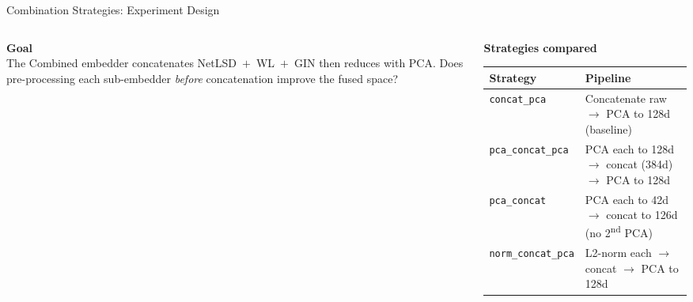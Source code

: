 \documentclass[aspectratio=169,10pt]{beamer}
\begin{document}
\begin{frame}[fragile]{Combination Strategies: Experiment Design}
\begin{columns}[T]
\begin{column}{0.50\textwidth}

  \textbf{Goal}\\[3pt]
  {\small The Combined embedder concatenates NetLSD~$+$~WL~$+$~GIN
  then reduces with PCA\@.  Does pre-processing each sub-embedder
  \emph{before} concatenation improve the fused space?}

  


\end{column}
\begin{column}{0.47\textwidth}
  \textbf{Strategies compared}
  \vspace{0.2em}

  {\scriptsize
  \begin{tabular}{p{2.2cm}p{4.4cm}}
    \toprule
    \textbf{Strategy} & \textbf{Pipeline} \\
    \midrule
    \texttt{concat\_pca}
      & Concatenate raw $\to$ PCA to 128d {\small(baseline)} \\
    \texttt{pca\_concat\_pca}
      & PCA each to 128d $\to$ concat (384d) $\to$ PCA to 128d \\
    \texttt{pca\_concat}
      & PCA each to 42d $\to$ concat to 126d {\small(no 2\textsuperscript{nd} PCA)} \\
    \texttt{norm\_concat\_pca}
      & L2-norm each $\to$ concat $\to$ PCA to 128d \\
    \bottomrule
  \end{tabular}}
  
\end{column}
\end{columns}
\end{frame}
\end{document}

